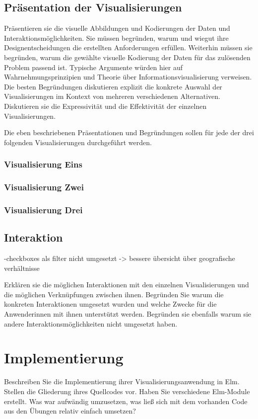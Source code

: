\documentclass[usegeometry=true]{scrartcl}
\begin{document}
\subsection{Präsentation der Visualisierungen}
Präsentieren sie die visuelle Abbildungen und Kodierungen der Daten und Interaktionsmöglichkeiten. 
Sie müssen  begründen, warum und wiegut ihre Designentscheidungen die erstellten Anforderungen erfüllen. 
Weiterhin müssen sie begründen, warum die gewählte visuelle Kodierung der Daten für das zulösenden Problem passend ist. 
Typische Argumente würden hier auf Wahrnehmungsprinzipien und Theorie über Informationsvisualisierung verweisen. 
Die besten Begründungen diskutieren explizit die konkrete Auswahl der Visualisierungen im Kontext von mehreren verschiedenen Alternativen. Diskutieren sie die Expressivität und die Effektivität der einzelnen Visualisierungen. 

Die eben beschriebenen Präsentationen und Begründungen sollen für jede der drei folgenden Visualisierungen durchgeführt werden. 
\subsubsection{Visualisierung Eins}
\subsubsection{Visualisierung Zwei}
\subsubsection{Visualisierung Drei}

\subsection{Interaktion}
-checkboxes als filter nicht umgesetzt -> bessere übersicht über geografische verhältnisse

Erklären sie die möglichen Interaktionen mit den einzelnen Visualisierungen und die möglichen Verknüpfungen zwischen ihnen. Begründen Sie warum die konkreten Interaktionen umgesetzt wurden und welche Zwecke für die Anwenderinnen mit ihnen unterstützt werden. Begründen sie ebenfalls warum sie andere Interaktionsmöglichkeiten nicht umgesetzt haben. 

\section{Implementierung}
Beschreiben Sie die Implementierung ihrer Visualisierungsanwendung in Elm. Stellen die Gliederung ihres Quellcodes vor. Haben Sie verschiedene Elm-Module erstellt. Was war aufwändig umzusetzen, was ließ sich mit dem vorhanden Code aus den Übungen relativ einfach umsetzen? 
\end{document}
